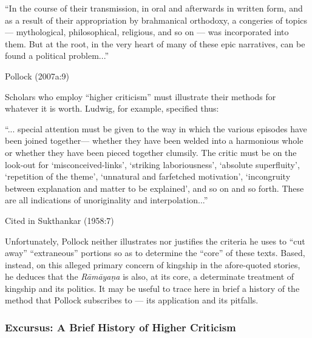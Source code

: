 \begin{myquote}
“In the course of their transmission, in oral and afterwards in written form, and as a result of their appropriation by brahmanical orthodoxy, a congeries of topics --- mythological, philosophical, religious, and so on --- was incorporated into them. But at the root, in the very heart of many of these epic narratives, can be found a political problem...”	

\hfill Pollock (2007a:9)
\end{myquote}

Scholars who employ “higher criticism” must illustrate their methods for whatever it is worth. Ludwig, for example, specified thus:

\begin{myquote}
“... special attention must be given to the way in which the various episodes have been joined together— whether they have been welded into a harmonious whole or whether they have been pieced together clumsily. The critic must be on the look-out for ‘misconceived-links’, ‘striking laboriousness’, ‘absolute superfluity’, ‘repetition of the theme’, ‘unnatural and farfetched motivation’, ‘incongruity between explanation and matter to be explained’, and so on and so forth. These are all indications of unoriginality and interpolation...”	

\hfill Cited in Sukthankar (1958:7)
\end{myquote}

Unfortunately, Pollock neither illustrates nor justifies the criteria he uses to “cut away”  ``extraneous'' portions so as to determine the “core” of these texts. Based, instead, on this alleged primary concern of kingship in the afore-quoted stories, he deduces that the {\sl Rāmāyaṇa} is also, at its core, a determinate treatment of kingship and its politics. It may be useful to trace here in brief a history of the method that Pollock subscribes to --- its application and its pitfalls.\\[-21pt]  

\subsubsection{Excursus: A   Brief History of Higher Criticism}\label{sec1.1.1.1}

